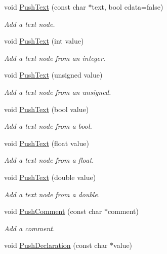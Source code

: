 \begin{DoxyCompactItemize}
void \hyperlink{classtinyxml2_1_1_x_m_l_printer_a1cc16a9362df4332012cb13cff6441b3}{Push\+Text} (const char $\ast$text, bool cdata=false)
\begin{DoxyCompactList}\small\item\em Add a text node. \end{DoxyCompactList}\item 
void \hyperlink{classtinyxml2_1_1_x_m_l_printer_a3e0d4d78de25d4cf081009e1431cea7e}{Push\+Text} (int value)
\begin{DoxyCompactList}\small\item\em Add a text node from an integer. \end{DoxyCompactList}\item 
void \hyperlink{classtinyxml2_1_1_x_m_l_printer_a661fb50e7e0a4918d2d259cb0fae647e}{Push\+Text} (unsigned value)
\begin{DoxyCompactList}\small\item\em Add a text node from an unsigned. \end{DoxyCompactList}\item 
void \hyperlink{classtinyxml2_1_1_x_m_l_printer_a4390e5fa1ed05189a8686647345ab29f}{Push\+Text} (bool value)
\begin{DoxyCompactList}\small\item\em Add a text node from a bool. \end{DoxyCompactList}\item 
void \hyperlink{classtinyxml2_1_1_x_m_l_printer_a1dbb1390e829d0673af66b9cd1928bd7}{Push\+Text} (float value)
\begin{DoxyCompactList}\small\item\em Add a text node from a float. \end{DoxyCompactList}\item 
void \hyperlink{classtinyxml2_1_1_x_m_l_printer_aa715302dfc09473c77c853cbd5431965}{Push\+Text} (double value)
\begin{DoxyCompactList}\small\item\em Add a text node from a double. \end{DoxyCompactList}\item 
void \hyperlink{classtinyxml2_1_1_x_m_l_printer_afc8416814219591c2fd5656e0c233140}{Push\+Comment} (const char $\ast$comment)
\begin{DoxyCompactList}\small\item\em Add a comment. \end{DoxyCompactList}\item 
void \hyperlink{classtinyxml2_1_1_x_m_l_printer_a2fe3565e262594efc6c0276723c83fe7}{Push\+Declaration} (const char $\ast$value)

\end{DoxyCompactItemize}
